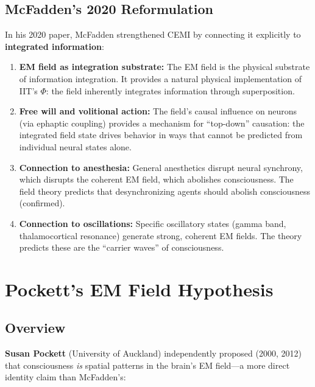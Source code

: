 \documentclass[11pt,a4paper]{report}
\begin{document}
\section{McFadden's 2020 Reformulation}

In his 2020 paper, McFadden strengthened CEMI by connecting it explicitly to \textbf{integrated information}:

\begin{fieldbox}
\begin{enumerate}[leftmargin=1.5em]
  \item \textbf{EM field as integration substrate:} The EM field is the physical substrate of information integration. It provides a natural physical implementation of IIT's $\Phi$: the field inherently integrates information through superposition.
  \item \textbf{Free will and volitional action:} The field's causal influence on neurons (via ephaptic coupling) provides a mechanism for ``top-down'' causation: the integrated field state drives behavior in ways that cannot be predicted from individual neural states alone.
  \item \textbf{Connection to anesthesia:} General anesthetics disrupt neural synchrony, which disrupts the coherent EM field, which abolishes consciousness. The field theory predicts that desynchronizing agents should abolish consciousness (confirmed).
  \item \textbf{Connection to oscillations:} Specific oscillatory states (gamma band, thalamocortical resonance) generate strong, coherent EM fields. The theory predicts these are the ``carrier waves'' of consciousness.
\end{enumerate}
\end{fieldbox}


\chapter{Pockett's EM Field Hypothesis}

\section{Overview}

\textbf{Susan Pockett} (University of Auckland) independently proposed (2000, 2012) that consciousness \emph{is} spatial patterns in the brain's EM field---a more direct identity claim than McFadden's:
\end{document}

